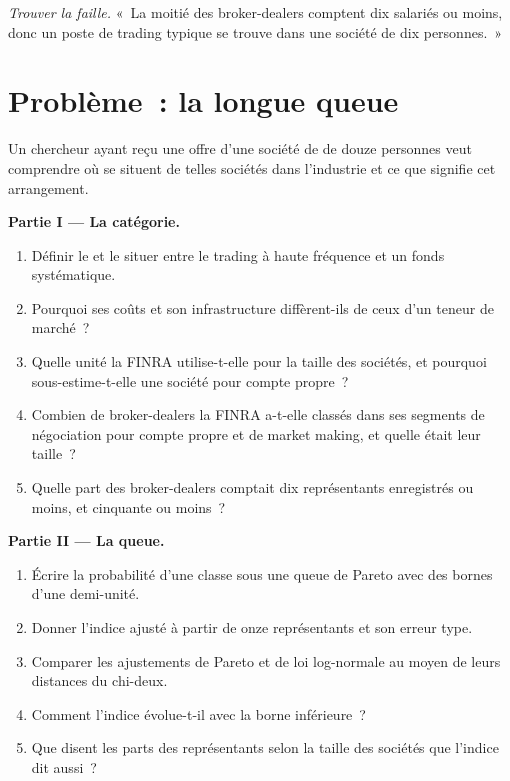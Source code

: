 \begin{exercise}[$\star\star\star$]\label{exo:in:medium-frequency-proprietary-shops:8}
\emph{Trouver la faille.} «~La moitié des broker-dealers comptent dix salariés ou moins, donc un poste de trading typique se trouve dans une société de
dix personnes.~»
\end{exercise}

\section{Problème~: la longue queue}

\begin{problem}\label{pb:in:medium-frequency-proprietary-shops:1}
Un chercheur ayant reçu une offre d'une société de  de douze personnes veut comprendre où se situent
de telles sociétés dans l'industrie et ce que signifie cet arrangement.

\medskip\noindent\textbf{Partie I --- La catégorie.}
\begin{enumerate}
\item Définir le  et le situer entre le trading à haute fréquence et un fonds systématique.
\item Pourquoi ses coûts et son infrastructure diffèrent-ils de ceux d'un teneur de marché~?
\item Quelle unité la FINRA utilise-t-elle pour la taille des sociétés, et pourquoi sous-estime-t-elle une société pour compte propre~?
\item Combien de broker-dealers la FINRA a-t-elle classés dans ses segments de négociation pour compte propre et de market making, et quelle était leur taille~?
\item Quelle part des broker-dealers comptait dix représentants enregistrés ou moins, et cinquante ou moins~?
\end{enumerate}

\medskip\noindent\textbf{Partie II --- La queue.}
\begin{enumerate}[resume]
\item Écrire la probabilité d'une classe sous une queue de Pareto avec des bornes d'une demi-unité.
\item Donner l'indice ajusté à partir de onze représentants et son erreur type.
\item Comparer les ajustements de Pareto et de loi log-normale au moyen de leurs distances du chi-deux.
\item Comment l'indice évolue-t-il avec la borne inférieure~?
\item Que disent les parts des représentants selon la taille des sociétés que l'indice dit aussi~?
\end{enumerate}


\end{problem}
